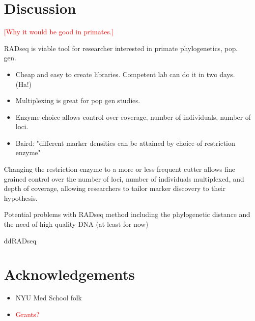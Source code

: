 \documentclass[12pt]{article}
\begin{document}
%
%

\section{Discussion}

\textcolor{red}{[Why it would be good in primates.]}

RADseq is viable tool for researcher interested in primate phylogenetics, pop. gen.

\begin{itemize}
	\item Cheap and easy to create libraries. Competent lab can do it in two days. (Ha!)
	\item Multiplexing is great for pop gen studies.
	\item Enzyme choice allows control over coverage, number of individuals, number of loci.
	\item Baird: "different marker densities can be attained by choice of restriction enzyme"
\end{itemize}
	
Changing the restriction enzyme to a more or less frequent cutter allows fine grained control over the number of loci, number of individuals multiplexed, and depth of coverage, allowing researchers to tailor marker discovery to their hypothesis. 

Potential problems with RADseq method including the phylogenetic distance and the need of high quality DNA (at least for now)

ddRADseq

\section{Acknowledgements}
\begin{itemize}
	\item NYU Med School folk
	\item \textcolor{red}{Grants?}
\end{itemize}
\end{document}
